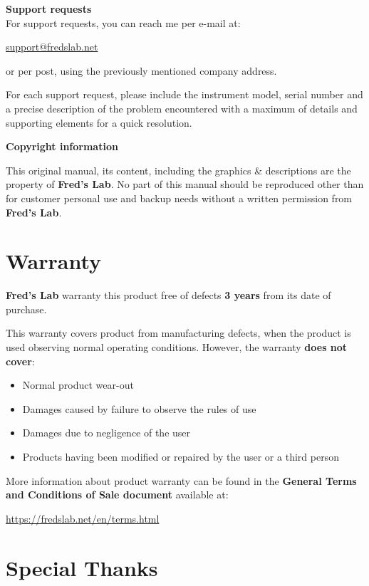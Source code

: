 \documentclass{scrartcl}
\begin{document}
\textbf{Support requests} \\
For support requests, you can reach me per e-mail at:
\begin{center}
    \url{support@fredslab.net}
\end{center}
or per post, using the previously mentioned company address.

For each support request, please include the instrument model, serial number and a precise description of the problem encountered with a maximum of details and supporting elements for a quick resolution.

\textbf{Copyright information}

This original manual, its content, including the graphics \& descriptions are the property of \textbf{Fred's Lab}. No part of this manual should be reproduced other than for customer personal use and backup needs without a written permission from \textbf{Fred's Lab}.

\pagebreak

\section*{Warranty}
\textbf{Fred's Lab} warranty this product free of defects \textbf{3 years} from its
date of purchase.

This warranty covers product from manufacturing defects, when the product is used observing normal operating conditions. However, the warranty \textbf{does not cover}:

\begin{itemize}
    \item Normal product wear-out
    \item Damages caused by failure to observe the rules of use
    \item Damages due to negligence of the user
    \item Products having been modified or repaired by the user or a third person
\end{itemize}

More information about product warranty can be found in the \textbf{General Terms and Conditions of Sale document} available at:
\begin{center}
    \url{https://fredslab.net/en/terms.html}
\end{center}

\section*{Special Thanks}
\end{document}
